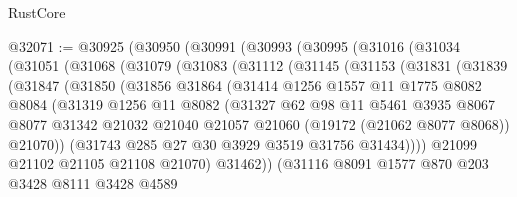 \begin{lexlean}{RustCore}
\begin{coremodule}
@32071 := @30925
    (@30950
      (@30991
        (@30993
          (@30995
            (@31016
              (@31034
                (@31051
                  (@31068
                    (@31079
                      (@31083
                        (@31112
                          (@31145
                            (@31153
                              (@31831
                                (@31839
                                  (@31847
                                    (@31850
                                      (@31856
                                        @31864
                                        (@31414
                                          @1256
                                          @1557
                                          @11
                                          @1775
                                          @8082
                                          @8084
                                          (@31319
                                            @1256
                                            @11
                                            @8082
                                            (@31327
                                              @62
                                              @98
                                              @11
                                              @5461
                                              @3935
                                              @8067
                                              @8077
                                              @31342
                                              @21032
                                              @21040
                                              @21057
                                              @21060
                                              (@19172 (@21062 @8077 @8068))
                                              @21070))
                                          (@31743 @285 @27 @30 @3929 @3519 @31756 @31434))))
                                    @21099
                                    @21102
                                    @21105
                                    @21108
                                    @21070)
                                  @31462))
                              (@31116
                                @8091
                                @1577
                                @870
                                @203
                                @3428
                                @8111
                                @3428
                                @4589

\end{coremodule}
\end{lexlean}
